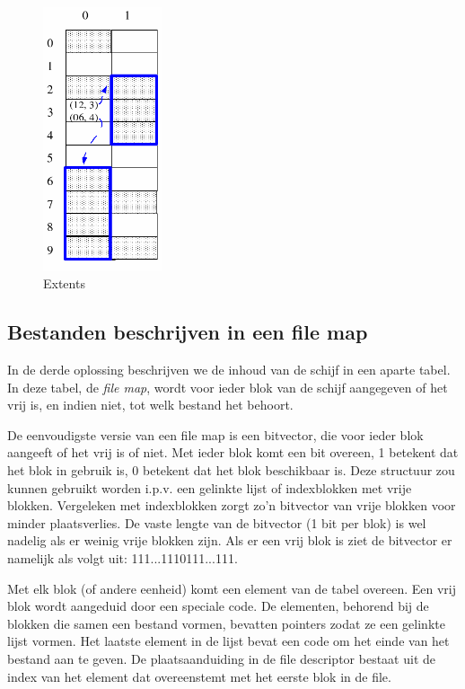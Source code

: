 \begin{figure}
\begin{center}
\includegraphics[width=35mm]{images/fig0412.png}
\caption{Extents}
\label{extents}
\end{center}
\end{figure}


\subsection{Bestanden beschrijven in een file map}

In de derde oplossing beschrijven we de inhoud van de schijf in
een aparte tabel. In deze tabel, de \emph{file map},
wordt voor ieder blok van de schijf aangegeven of het vrij is, en
indien niet, tot welk bestand het behoort.

De eenvoudigste versie van een file map is een bitvector, die
voor ieder blok aangeeft of het vrij is of niet. Met ieder blok komt
een bit overeen, 1 betekent dat het blok in gebruik is, 0 betekent dat
het blok beschikbaar is. Deze structuur zou kunnen gebruikt worden
i.p.v. een gelinkte lijst of indexblokken met vrije blokken.
Vergeleken met indexblokken zorgt zo'n bitvector van vrije blokken
voor minder plaatsverlies. De vaste lengte van de bitvector (1 bit per
blok) is wel nadelig als er weinig vrije blokken zijn. Als er een vrij
blok is ziet de bitvector er namelijk als volgt uit:
111...1110111...111.

Met elk blok (of andere eenheid) komt een element van de tabel
overeen. Een vrij blok wordt aangeduid door een speciale code. De
elementen, behorend bij de blokken die samen een bestand vormen,
bevatten pointers zodat ze een gelinkte lijst vormen. Het laatste
element in de lijst bevat een code om het einde van het bestand aan te
geven. De plaatsaanduiding in de file descriptor bestaat uit de index
van het element dat overeenstemt met het eerste blok in de
file.

